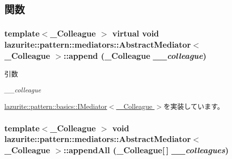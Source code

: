 \subsection{関数}
\hypertarget{classlazurite_1_1pattern_1_1mediators_1_1_abstract_mediator_3_01___colleague_01_4_ad1f32a3e3f783bbb6a5f09de8c991554}{
\subsubsection[{append}]{\setlength{\rightskip}{0pt plus 5cm}template$<$\_\-Colleague $>$ virtual void lazurite::pattern::mediators::AbstractMediator$<$ \_\-Colleague $>$::append (\_\-Colleague {\em \_\-\_\-colleague})}}
\label{classlazurite_1_1pattern_1_1mediators_1_1_abstract_mediator_3_01___colleague_01_4_ad1f32a3e3f783bbb6a5f09de8c991554}

\begin{DoxyParams}{引数}
\item[{\em \_\-\_\-colleague}]\end{DoxyParams}


\hyperlink{interfacelazurite_1_1pattern_1_1basics_1_1_i_mediator_3_01___colleague_01_4_a2141258ad0ee2979eb65d5a39cb464a8}{lazurite::pattern::basics::IMediator$<$ \_\-Colleague $>$}を実装しています。\hypertarget{classlazurite_1_1pattern_1_1mediators_1_1_abstract_mediator_3_01___colleague_01_4_ab8c021c05638b19a8a4c6809740d6198}{
\subsubsection[{appendAll}]{\setlength{\rightskip}{0pt plus 5cm}template$<$\_\-Colleague $>$ void lazurite::pattern::mediators::AbstractMediator$<$ \_\-Colleague $>$::appendAll (\_\-Colleague\mbox{[}$\,$\mbox{]} {\em \_\-\_\-colleagues})}}
\label{classlazurite_1_1pattern_1_1mediators_1_1_abstract_mediator_3_01___colleague_01_4_ab8c021c05638b19a8a4c6809740d6198}

